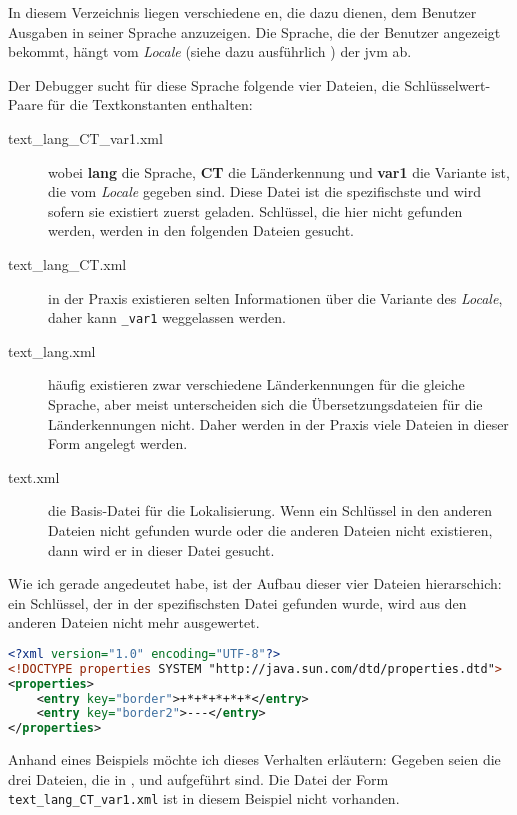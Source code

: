 In diesem Verzeichnis liegen verschiedene en, die dazu dienen, dem Benutzer Ausgaben in seiner Sprache anzuzeigen. Die Sprache, die der Benutzer angezeigt bekommt, hängt vom \emph{Locale} (siehe dazu ausführlich \cite{Oracle2010Loc}) der \gls{jvm} ab.

Der Debugger sucht für diese Sprache folgende vier Dateien, die Schlüsselwert-Paare für die Textkonstanten enthalten:
\begin{description}
\item[text_lang_CT_var1.xml] wobei \textbf{lang} die Sprache, \textbf{CT} die Länderkennung und \textbf{var1} die Variante ist, die vom \emph{Locale} gegeben sind. Diese Datei ist die spezifischste und wird sofern sie existiert zuerst geladen. Schlüssel, die hier nicht gefunden werden, werden in den folgenden Dateien gesucht.
\item[text_lang_CT.xml] in der Praxis existieren selten Informationen über die Variante des \emph{Locale}, daher kann \texttt{_var1} weggelassen werden.
\item[text_lang.xml] häufig existieren zwar verschiedene Länderkennungen für die gleiche Sprache, aber meist unterscheiden sich die Übersetzungsdateien für die Länderkennungen nicht. Daher werden in der Praxis viele Dateien in dieser Form angelegt werden.
\item[text.xml] die Basis-Datei für die Lokalisierung. Wenn ein Schlüssel in den anderen Dateien nicht gefunden wurde oder die anderen Dateien nicht existieren, dann wird er in dieser Datei gesucht.
\end{description}

Wie ich gerade angedeutet habe, ist der Aufbau dieser vier Dateien hierarschich: ein Schlüssel, der in der spezifischsten Datei gefunden wurde, wird aus den anderen Dateien nicht mehr ausgewertet.

\begin{lstlisting}[language=XML,caption={Beispiel für Datei \texttt{text_de_DE.xml}},label=\lstlbl{locale-file-de-de}]
<?xml version="1.0" encoding="UTF-8"?>
<!DOCTYPE properties SYSTEM "http://java.sun.com/dtd/properties.dtd">
<properties>
	<entry key="border">+*+*+*+*+*</entry>
	<entry key="border2">---</entry>
</properties>
\end{lstlisting}

Anhand eines Beispiels möchte ich dieses Verhalten erläutern: Gegeben seien die drei Dateien, die in ,  und  aufgeführt sind. Die Datei der Form \texttt{text_lang_CT_var1.xml} ist in diesem Beispiel nicht vorhanden.

